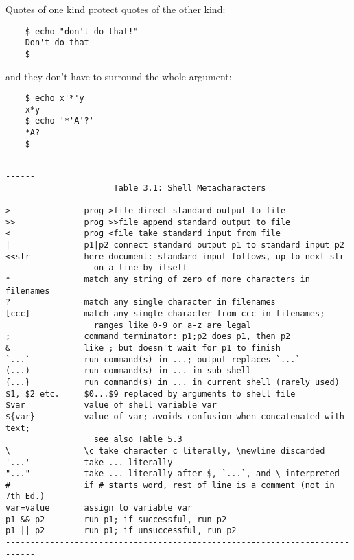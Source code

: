    Quotes of one kind protect quotes of the other kind:
\begin{verbatim}
    $ echo "don't do that!"
    Don't do that
    $
\end{verbatim}
and they don't have to surround the whole argument:
\begin{verbatim}
    $ echo x'*'y
    x*y
    $ echo '*'A'?'
    *A?
    $
\end{verbatim}

\begin{verbatim}
----------------------------------------------------------------------------
                      Table 3.1: Shell Metacharacters                        
                                                                             
>               prog >file direct standard output to file                    
>>              prog >>file append standard output to file                   
<               prog <file take standard input from file                     
|               p1|p2 connect standard output p1 to standard input p2        
<<str           here document: standard input follows, up to next str        
                  on a line by itself                                        
*               match any string of zero of more characters in filenames     
?               match any single character in filenames                      
[ccc]           match any single character from ccc in filenames;            
                  ranges like 0-9 or a-z are legal                           
;               command terminator: p1;p2 does p1, then p2                   
&               like ; but doesn't wait for p1 to finish                     
`...`           run command(s) in ...; output replaces `...`                 
(...)           run command(s) in ... in sub-shell                           
{...}           run command(s) in ... in current shell (rarely used)         
$1, $2 etc.     $0...$9 replaced by arguments to shell file                  
$var            value of shell variable var                                  
${var}          value of var; avoids confusion when concatenated with text;  
                  see also Table 5.3                                         
\               \c take character c literally, \newline discarded            
'...'           take ... literally                                           
"..."           take ... literally after $, `...`, and \ interpreted         
#               if # starts word, rest of line is a comment (not in 7th Ed.) 
var=value       assign to variable var                                       
p1 && p2        run p1; if successful, run p2                                
p1 || p2        run p1; if unsuccessful, run p2                              
----------------------------------------------------------------------------
\end{verbatim}


